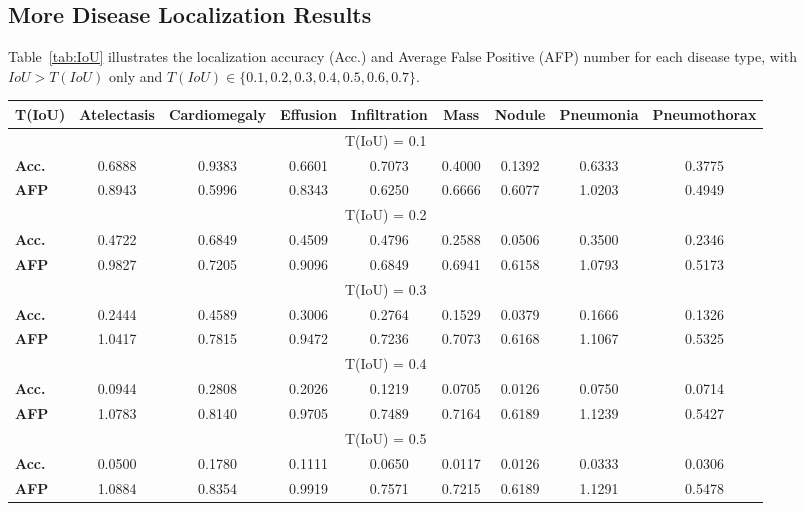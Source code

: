 \documentclass[10pt,twocolumn,letterpaper]{article}
\begin{document}
\subsection{More Disease Localization Results}
Table~\ref{tab:IoU} illustrates the localization accuracy (Acc.) and Average False Positive (AFP) number for each disease type, with  $IoU > T(IoU)$ only and $T(IoU)\in \{0.1, 0.2, 0.3, 0.4, 0.5, 0.6,0.7\}$. 

\begin{table}[t]
	
	\begin{center}
		\begin{tabular}{|p{6.5em}||c|c|c|c|c|c|c|c|}
			\hline
			{\bf T(IoU)}   & {\bf Atelectasis} & {\bf Cardiomegaly} & {\bf Effusion} & {\bf Infiltration} & {\bf Mass} & {\bf Nodule} & {\bf Pneumonia} & {\bf Pneumothorax} \\
			\hline\hline
			\multicolumn{9}{|c|}{T(IoU) = 0.1}\\
			\hline
			{\bf Acc.}   & 0.6888&0.9383&0.6601&0.7073&0.4000&0.1392&0.6333&0.3775\\
			\hline
			{\bf AFP}    & 0.8943&0.5996&0.8343&0.6250&0.6666&0.6077&1.0203&0.4949\\
			\hline
			\multicolumn{9}{|c|}{T(IoU) = 0.2 }\\
			\hline
			{\bf Acc.}   & 0.4722&0.6849&0.4509&0.4796&0.2588&0.0506&0.3500&0.2346\\
			\hline
			{\bf AFP}   & 0.9827&0.7205&0.9096&0.6849&0.6941&0.6158&1.0793&0.5173\\
			\hline
			\multicolumn{9}{|c|}{T(IoU) = 0.3}\\
			\hline
			{\bf Acc.}   &0.2444&0.4589&0.3006&0.2764&0.1529&0.0379&0.1666&0.1326\\
			\hline
			{\bf AFP}   & 1.0417&0.7815&0.9472&0.7236&0.7073&0.6168&1.1067&0.5325\\
			\hline
			\multicolumn{9}{|c|}{T(IoU) = 0.4}\\
			\hline
			{\bf Acc.}   &0.0944&0.2808&0.2026&0.1219&0.0705&0.0126&0.0750&0.0714\\
			\hline
			{\bf AFP}   & 1.0783&0.8140&0.9705&0.7489&0.7164&0.6189&1.1239&0.5427\\
			\hline
			\multicolumn{9}{|c|}{T(IoU) = 0.5 }\\
			\hline
			{\bf Acc.}   & 0.0500&0.1780&0.1111&0.0650&0.0117&0.0126&0.0333&0.0306\\
			\hline
			{\bf AFP}   & 1.0884&0.8354&0.9919&0.7571&0.7215&0.6189&1.1291&0.5478\\

\end{tabular}
\end{center}
\end{table}
\end{document}
